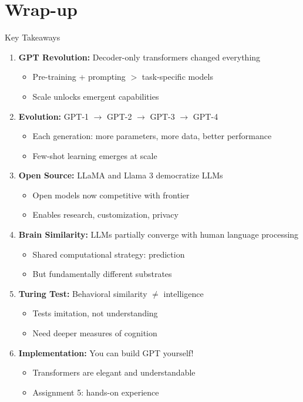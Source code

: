 \documentclass[aspectratio=169]{beamer}
\begin{document}
\section{Wrap-up}

\begin{frame}{Key Takeaways 🔑}
\begin{enumerate}
    \item \textbf{GPT Revolution:} Decoder-only transformers changed everything
    \begin{itemize}
        \item Pre-training + prompting $>$ task-specific models
        \item Scale unlocks emergent capabilities
    \end{itemize}

    \item \textbf{Evolution:} GPT-1 $\rightarrow$ GPT-2 $\rightarrow$ GPT-3 $\rightarrow$ GPT-4
    \begin{itemize}
        \item Each generation: more parameters, more data, better performance
        \item Few-shot learning emerges at scale
    \end{itemize}

    \item \textbf{Open Source:} LLaMA and Llama 3 democratize LLMs
    \begin{itemize}
        \item Open models now competitive with frontier
        \item Enables research, customization, privacy
    \end{itemize}

    \item \textbf{Brain Similarity:} LLMs partially converge with human language processing
    \begin{itemize}
        \item Shared computational strategy: prediction
        \item But fundamentally different substrates
    \end{itemize}

    \item \textbf{Turing Test:} Behavioral similarity $\neq$ intelligence
    \begin{itemize}
        \item Tests imitation, not understanding
        \item Need deeper measures of cognition
    \end{itemize}

    \item \textbf{Implementation:} You can build GPT yourself!
    \begin{itemize}
        \item Transformers are elegant and understandable
        \item Assignment 5: hands-on experience
    \end{itemize}
\end{enumerate}
\end{frame}
\end{document}
